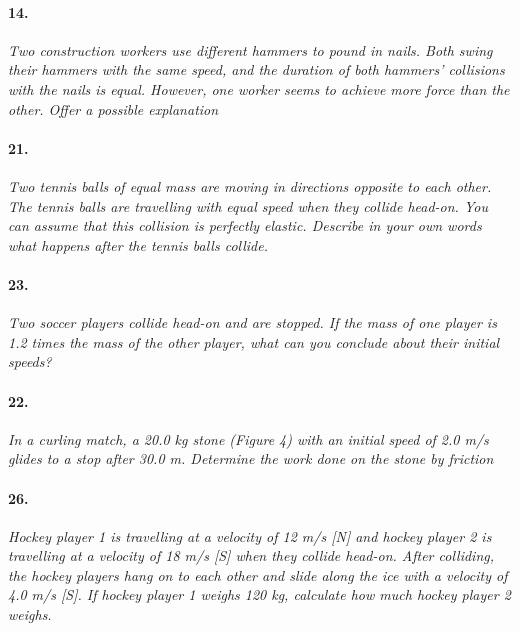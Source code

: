 \documentclass[]{article}
\begin{document}
	\paragraph{14.}
	\textit{
		Two construction workers use different hammers
		to pound in nails. Both swing their hammers with
		the same speed, and the duration of both hammers’
		collisions with the nails is equal. However, one worker
		seems to achieve more force than the other. Offer a
		possible explanation
	}\\	
	\par
	\paragraph{21.}
	\textit{
		Two tennis balls of equal mass are moving in
		directions opposite to each other. The tennis balls
		are travelling with equal speed when they collide
		head-on. You can assume that this collision is
		perfectly elastic. Describe in your own words what
		happens after the tennis balls collide. 
	}\\	
	\par
	\paragraph{23.}
	\textit{
		Two soccer players collide head-on and are stopped.
		If the mass of one player is 1.2 times the mass of the
		other player, what can you conclude about their initial
		speeds?
	}\\	
	\par
	\paragraph{22.}
	\textit{
		In a curling match, a 20.0 kg stone (Figure 4) with an
		initial speed of 2.0 m/s glides to a stop after 30.0 m.
		Determine the work done on the stone by friction
	}\\	
	\par
	\paragraph{26.}
	\textit{
		Hockey player 1 is travelling at a velocity of 12 m/s [N]
		and hockey player 2 is travelling at a velocity of
		18 m/s [S] when they collide head-on. After colliding,
		the hockey players hang on to each other and slide
		along the ice with a velocity of 4.0 m/s [S]. If hockey
		player 1 weighs 120 kg, calculate how much hockey
		player 2 weighs.
	}\\	
	\par
\end{document}

